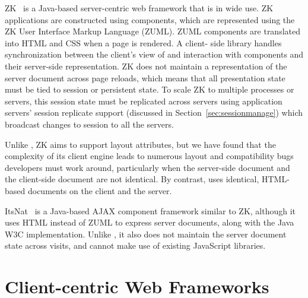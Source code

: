 ZK~\cite{ChenCheng:book2007} is a Java-based server-centric web framework that
is in wide use. ZK applications are constructed using components, which are
represented using the ZK User Interface Markup Language (ZUML).  ZUML
components are translated into HTML and CSS when a page is rendered. A client-
side library handles synchronization between the client's  view of and
interaction with components and their server-side  representation.  ZK does
not maintain a representation of the server document across page reloads,
which means that all presentation state must be tied to session or persistent
state. To scale ZK to multiple processes or servers, this session state must
be replicated across servers using application servers' session replicate
support  (discussed in Section~\ref{sec:sessionmanage}) which broadcast
changes to session to all the servers.

Unlike \projectname{}, ZK aims to support layout attributes, but
we have found that the complexity of its client engine leads to 
numerous layout and compatibility bugs developers must work around,
particularly when the server-side document and the client-side
document are not identical.  By contrast, \cb uses identical, HTML-based
documents on the client and the server.

ItsNat~\cite{JoseMariaArranzSantamariaItsNat} is a Java-based AJAX
component framework similar to ZK, although it uses HTML instead of
ZUML to express server documents, along with the Java W3C implementation.  
Unlike \projectname, it also does not maintain the server document 
state across visits, and cannot make use of existing JavaScript libraries.






\section{Client-centric Web Frameworks}

